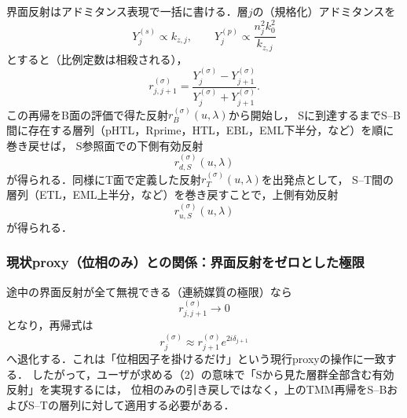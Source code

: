 界面反射はアドミタンス表現で一括に書ける．層$j$の（規格化）アドミタンスを
\[
Y_j^{(s)} \propto k_{z,j},
\qquad
Y_j^{(p)} \propto \frac{n_j^2 k_0^2}{k_{z,j}}
\]
とすると（比例定数は相殺される），
\[
r_{j,j+1}^{(\sigma)}=
\frac{Y_j^{(\sigma)}-Y_{j+1}^{(\sigma)}}{Y_j^{(\sigma)}+Y_{j+1}^{(\sigma)}}.
\]
この再帰をB面の評価で得た反射$r_B^{(\sigma)}(u,\lambda)$から開始し，
Sに到達するまでS--B間に存在する層列（pHTL，Rprime，HTL，EBL，EML下半分，など）を順に巻き戻せば，
S参照面での下側有効反射
\[
r_{d,S}^{(\sigma)}(u,\lambda)
\]
が得られる．同様にT面で定義した反射$r_T^{(\sigma)}(u,\lambda)$を出発点として，
S--T間の層列（ETL，EML上半分，など）を巻き戻すことで，上側有効反射
\[
r_{u,S}^{(\sigma)}(u,\lambda)
\]
が得られる．

\subsubsection{現状proxy（位相のみ）との関係：界面反射をゼロとした極限}
途中の界面反射が全て無視できる（連続媒質の極限）なら
\[
r_{j,j+1}^{(\sigma)}\to 0
\]
となり，再帰式は
\[
r_j^{(\sigma)} \approx r_{j+1}^{(\sigma)} e^{2i\delta_{j+1}}
\]
へ退化する．これは「位相因子を掛けるだけ」という現行proxyの操作に一致する．
したがって，ユーザが求める（2）の意味で「Sから見た層群全部含む有効反射」を実現するには，
位相のみの引き戻しではなく，上のTMM再帰をS--BおよびS--Tの層列に対して適用する必要がある．
